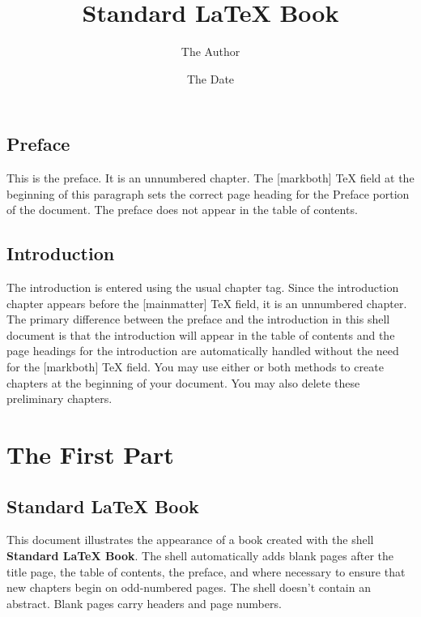 \documentclass{book}%
\begin{document}
\frontmatter
\title{Standard
\LaTeX{}
Book}
\author{The Author}
\date{The Date}
\maketitle
\tableofcontents

\chapter*{Preface}

This is the preface. It is an unnumbered chapter.
The [markboth]
\TeX{}
field at the beginning of this paragraph sets the correct page heading for the
Preface portion of the document. The preface does not appear in the table of contents.

\chapter{Introduction}

The introduction is entered using the usual chapter tag. Since the
introduction chapter appears before the [mainmatter]
\TeX{}
field, it is an unnumbered chapter. The primary difference between the preface
and the introduction in this shell document is that the introduction will
appear in the table of contents and the page headings for the introduction are
automatically handled without the need for the [markboth]
\TeX{}
field. You may use either or both methods to create chapters at the beginning
of your document. You may also delete these preliminary chapters.

\mainmatter


\part{The First Part}

\chapter{Standard
\LaTeX{}
Book}

This document illustrates the appearance of a book created with the shell
\textbf{Standard LaTeX Book}. The shell automatically adds blank pages after
the title page, the table of contents, the preface, and where necessary to
ensure that new chapters begin on odd-numbered pages. The shell doesn't
contain an abstract. Blank pages carry headers and page numbers.
\end{document}
